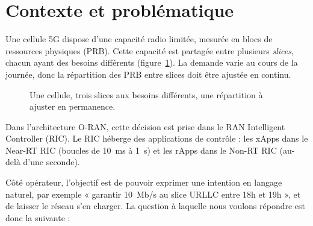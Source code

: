 \documentclass[11pt,a4paper]{article}
\begin{document}
\section{Contexte et problématique}

Une cellule 5G dispose d'une capacité radio limitée, mesurée en blocs de ressources
physiques (PRB). Cette capacité est partagée entre plusieurs \emph{slices}, chacun ayant
des besoins différents (figure~\ref{fig:slices}). La demande varie au cours de la
journée, donc la répartition des PRB entre slices doit être ajustée en continu.

\begin{figure}[H]
\centering
{}
\caption{Une cellule, trois slices aux besoins différents, une répartition à ajuster en permanence.}
\label{fig:slices}
\end{figure}

Dans l'architecture O-RAN, cette décision est prise dans le RAN Intelligent Controller
(RIC). Le RIC héberge des applications de contrôle : les xApps dans le Near-RT RIC
(boucles de 10~ms à 1~s) et les rApps dans le Non-RT RIC (au-delà d'une seconde).

Côté opérateur, l'objectif est de pouvoir exprimer une intention en langage naturel,
par exemple « garantir 10~Mb/s au slice URLLC entre 18h et 19h », et de laisser le
réseau s'en charger. La question à laquelle nous voulons répondre est donc la suivante :
\end{document}
